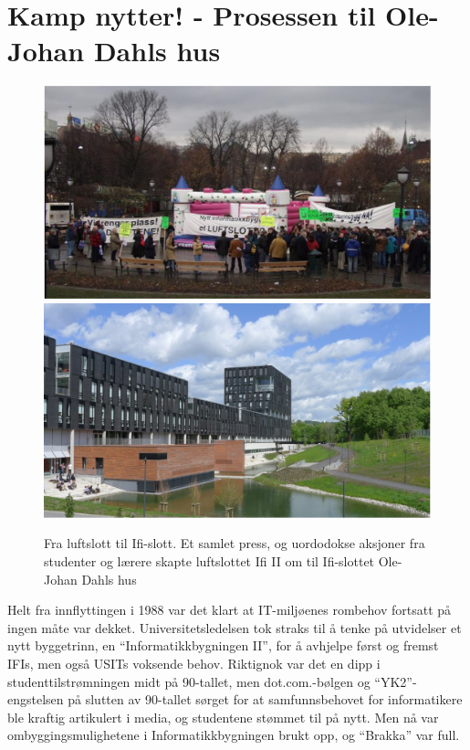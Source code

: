 \documentclass[../../main.tex]{subfiles}
\begin{document}
\chapter[Ifi 2]{Kamp nytter! - Prosessen til Ole-Johan Dahls hus}

\author{Narve Trædal}

\begin{figure}
	\includegraphics[width=\linewidth]{images/hoppeslott.png}
	\includegraphics[width=\linewidth]{images/ifi2.png}
	\caption{Fra luftslott til Ifi-slott. Et samlet press, og uordodokse aksjoner fra studenter og lærere skapte luftslottet Ifi II om til Ifi-slottet Ole-Johan Dahls hus}
\end{figure}

Helt fra innflyttingen i 1988 var det klart at IT-miljøenes rombehov fortsatt på ingen måte var dekket. Universitetsledelsen tok straks til å tenke på utvidelser et nytt byggetrinn, en ``Informatikkbygningen II'', for å avhjelpe først og fremst IFIs, men også USITs voksende behov. Riktignok var det en dipp i studenttilstrømningen midt på 90-tallet, men dot.com.-bølgen og ``YK2''- engstelsen på slutten av 90-tallet sørget for at samfunnsbehovet for informatikere ble kraftig artikulert i media, og studentene stømmet til på nytt. Men nå var ombyggingsmulighetene i Informatikkbygningen brukt opp, og ``Brakka'' var full.
\end{document}
